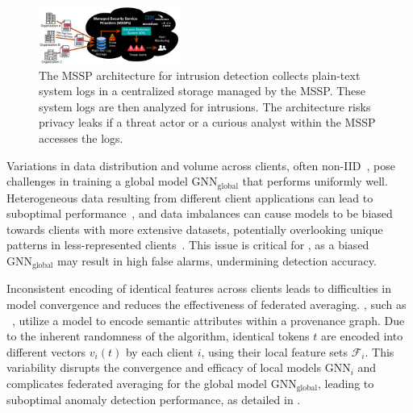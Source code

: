 \begin{figure}[t!]
  \centering
  \includegraphics[width=0.42\textwidth]{fig/mssp.pdf}
  \caption{The MSSP architecture for intrusion detection collects plain-text system logs in a centralized storage managed by the MSSP. These system logs are then analyzed for intrusions. The architecture risks privacy leaks if a threat actor or a curious analyst within the MSSP accesses the logs.}
  \label{mssp}
  \vspace{-4ex}
\end{figure}


\begin{enumerate}[itemsep=0.1em, parsep=0em, topsep=0em, leftmargin=*]
   Variations in data distribution and volume across clients, often non-IID~\cite{zhao2018federated}, pose challenges in training a global model \( \text{GNN}_{\text{global}} \) that performs uniformly well. Heterogeneous data resulting from different client applications can lead to suboptimal performance~\cite{qu2022rethinking}, and data imbalances can cause models to be biased towards clients with more extensive datasets, potentially overlooking unique patterns in less-represented clients~\cite{duan2020self}. This issue is critical for \pids, as a biased \( \text{GNN}_{\text{global}} \) may result in high false alarms, undermining detection accuracy.

   Inconsistent encoding of identical features across clients leads to difficulties in model convergence and reduces the effectiveness of federated averaging. \pids, such as \flash~\cite{cheng2023kairos}, utilize a \wordvec model to encode semantic attributes within a provenance graph. Due to the inherent randomness of the \wordvec algorithm, identical tokens \( t \) are encoded into different vectors \( v_i(t) \) by each client \( i \), using their local feature sets \( \mathcal{F}_i \). This variability disrupts the convergence and efficacy of local \gnn models \( \text{GNN}_{i} \) and complicates federated averaging for the global \gnn model \( \text{GNN}_{\text{global}} \), leading to suboptimal anomaly detection performance, as detailed in \cite{zhou2023fedfa}.


\end{enumerate}
